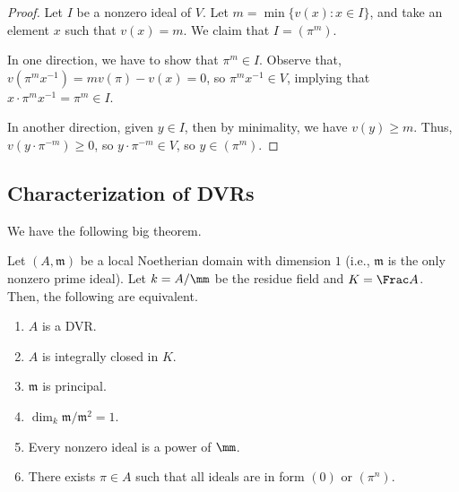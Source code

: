 \begin{proof}
    Let $I$ be a nonzero ideal of $V$.
    Let $m = \min\{v(x) : x\in I\}$, and take an element 
    $x$ such that $v(x)=m$. We claim that $I=(\pi^m)$.

    In one direction, we have to show that $\pi^m\in I$.
    Observe that, $v(\pi^m x^{-1}) = mv(\pi) - v(x) = 0$,
    so $\pi^m x^{-1}\in V$, implying that 
    $x\cdot \pi^mx^{-1} = \pi^m\in I$.

    In another direction, given $y\in I$, then by minimality, we have
    $v(y)\geq m$. Thus, $v(y\cdot \pi^{-m})\geq 0$,
    so $y\cdot \pi^{-m}\in V$, so $y\in (\pi^m)$.
\end{proof}
\subsection{Characterization of DVRs}
We have the following big theorem.
\begin{theorem}
    \label{thm:dvr}
    Let $(A,\mathfrak m)$ be a local Noetherian domain
    with dimension $1$ (i.e., $\mathfrak m$ is the only nonzero
    prime ideal). 
    Let $k=A/\mm$ be the residue field
    and $K=\Frac A$.
    Then, the following are equivalent.
    \begin{enumerate}[label=(\alph*)]
	\item $A$ is a DVR.
	\item $A$ is integrally closed in $K$.
	\item $\mathfrak m$ is principal.
	\item $\dim_k \mathfrak m/\mathfrak m^2 = 1$.
        \item Every nonzero ideal is a power of $\mm$.
	\item There exists $\pi\in A$ such that
	    all ideals are in form $(0)$ or $(\pi^n)$.
    \end{enumerate}
\end{theorem}
